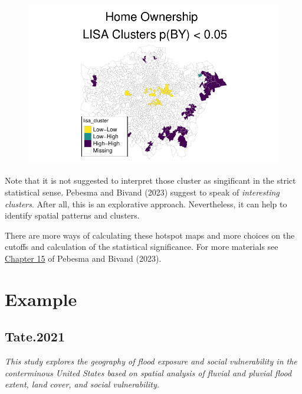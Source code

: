 \documentclass[
  letterpaper,
  DIV=11,
  numbers=noendperiod]{scrreprt}
\begin{document}
\begin{figure}[H]

{\centering \includegraphics{04_dependence_files/figure-pdf/unnamed-chunk-19-1.pdf}

}

\end{figure}

Note that it is not suggested to interpret those cluster as singificant
in the strict statistical sense. Pebesma and Bivand (2023) suggest to
speak of \emph{interesting clusters}. After all, this is an explorative
approach. Nevertheless, it can help to identify spatial patterns and
clusters.

There are more ways of calculating these hotspot maps and more choices
on the cutoffs and calculation of the statistical significance. For more
materials see \href{https://r-spatial.org/book/15-Measures.html}{Chapter
15} of Pebesma and Bivand (2023).

\hypertarget{example-1}{%
\section{Example}\label{example-1}}

\hypertarget{tate.2021}{%
\subsection*{Tate.2021}\label{tate.2021}}

\emph{This study explores the geography of flood exposure and social
vulnerability in the conterminous United States based on spatial
analysis of fluvial and pluvial flood extent, land cover, and social
vulnerability.}
\end{document}
